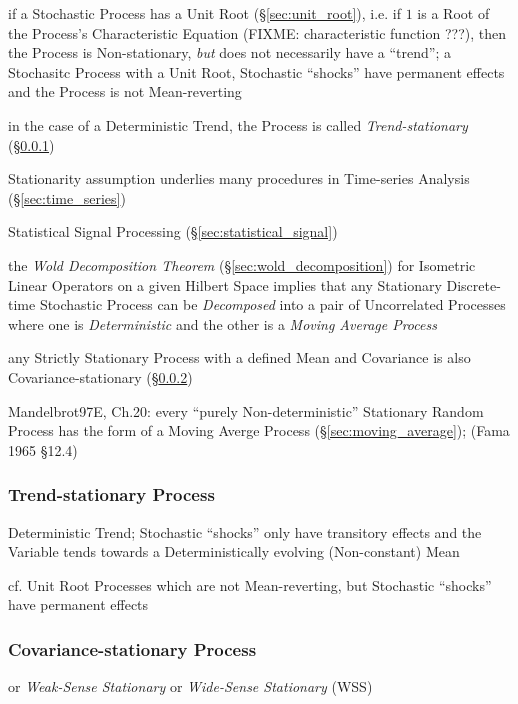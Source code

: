 if a Stochastic Process has a Unit Root (\S\ref{sec:unit_root}), i.e. if $1$ is
a Root of the Process's Characteristic Equation (FIXME: characteristic function
???), then the Process is Non-stationary, \emph{but} does not necessarily have a
``trend''; a Stochasitc Process with a Unit Root, Stochastic ``shocks'' have
permanent effects and the Process is not Mean-reverting

in the case of a Deterministic Trend, the Process is called
\emph{Trend-stationary} (\S\ref{sec:trend_stationary})

\fist Stationarity assumption underlies many procedures in Time-series Analysis
(\S\ref{sec:time_series})

\fist Statistical Signal Processing (\S\ref{sec:statistical_signal})

the \emph{Wold Decomposition Theorem} (\S\ref{sec:wold_decomposition}) for
Isometric Linear Operators on a given Hilbert Space implies that any Stationary
Discrete-time Stochastic Process can be \emph{Decomposed} into a pair of
Uncorrelated Processes where one is \emph{Deterministic} and the other is a
\emph{Moving Average Process}

any Strictly Stationary Process with a defined Mean and Covariance is also
Covariance-stationary (\S\ref{sec:covariance_stationary})

Mandelbrot97E, Ch.20: every ``purely Non-deterministic'' Stationary Random
Process has the form of a Moving Averge Process (\S\ref{sec:moving_average});
(Fama 1965 \S 12.4)



\subsubsection{Trend-stationary Process}\label{sec:trend_stationary}

Deterministic Trend; Stochastic ``shocks'' only have transitory effects and the
Variable tends towards a Deterministically evolving (Non-constant) Mean

cf. Unit Root Processes which are not Mean-reverting, but Stochastic ``shocks''
have permanent effects



\subsubsection{Covariance-stationary Process}\label{sec:covariance_stationary}

or \emph{Weak-Sense Stationary} or \emph{Wide-Sense Stationary} (WSS)

